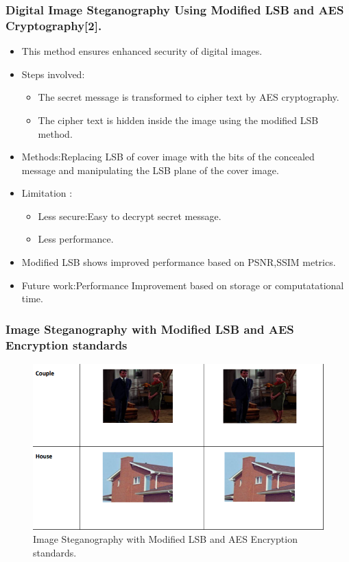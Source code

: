 \documentclass{beamer} %
\theoremstyle{definition} %
\begin{document}
\begin{frame}
\frametitle{Digital Image Steganography Using Modified LSB and AES Cryptography[2].}
\begin{itemize}
	\item{ This method ensures enhanced security of digital images.  }
	\item {Steps involved:}
	\begin{itemize}
	\item{The secret message is transformed to cipher text by AES cryptography.}
	\item{ The cipher text is hidden inside the image using the modified LSB method.}
	\end{itemize}
	\item{Methods:Replacing LSB of cover image with the bits of the concealed message and manipulating the LSB plane of the cover image.}
	\item{Limitation :}
	\begin{itemize}
		\item {Less secure:Easy to decrypt secret message.}
		\item {Less performance.}
	\end{itemize}
	\item{Modified LSB shows improved performance based on PSNR,SSIM metrics.} 
	\item{Future work:Performance Improvement based on storage or computatational time.}
\end{itemize}
\end{frame}

\begin{frame}
 \frametitle{Image Steganography with Modified LSB and AES Encryption standards}
	\begin{figure}
		\includegraphics[scale=0.45]{modifiedLSB.png}
		\caption{Image Steganography with Modified LSB and AES Encryption standards.}
	\end{figure}
\end{frame}
\end{document}
